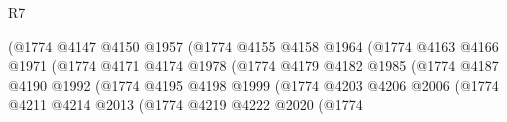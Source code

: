 \begin{lexlean}{R7}
\begin{coremodule}
                                                (@1774
                                                  @4147
                                                  @4150
                                                  @1957
                                                  (@1774
                                                    @4155
                                                    @4158
                                                    @1964
                                                    (@1774
                                                      @4163
                                                      @4166
                                                      @1971
                                                      (@1774
                                                        @4171
                                                        @4174
                                                        @1978
                                                        (@1774
                                                          @4179
                                                          @4182
                                                          @1985
                                                          (@1774
                                                            @4187
                                                            @4190
                                                            @1992
                                                            (@1774
                                                              @4195
                                                              @4198
                                                              @1999
                                                              (@1774
                                                                @4203
                                                                @4206
                                                                @2006
                                                                (@1774
                                                                  @4211
                                                                  @4214
                                                                  @2013
                                                                  (@1774
                                                                    @4219
                                                                    @4222
                                                                    @2020
                                                                    (@1774

\end{coremodule}
\end{lexlean}
